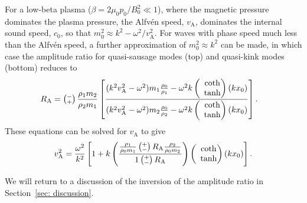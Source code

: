 \documentclass[namedreferences]{solarphysics}
\numberwithin{equation}{section}
\begin{document}
\begin{article}
For a low-beta plasma ($\beta = 2\mu_0p_0/B_0^2 \ll 1$), where the magnetic pressure dominates the plasma pressure, the Alfv\'{e}n speed, $v_\textrm{A}$, dominates the internal sound speed, $c_0$, so that $m_0^2 \approx k^2-\omega^2/v_\textrm{A}^2$. For waves with phase speed much less than the Alfv\'{e}n speed, a further approximation of $m_0^2 \approx k^2$ can be made, in which case the amplitude ratio for quasi-sausage modes (top) and quasi-kink modes (bottom) reduces to
\begin{align}
R_\textrm{A} &= \left(\substack{- \\ +}\right) \frac{\rho_1m_2}{\rho_2m_1} \left[ \frac{(k^2v_\textrm{A}^2-\omega^2)m_1\frac{\rho_0}{\rho_1}-\omega^2k \left(\hspace{-0.07in}\begin{matrix} &\coth \\ &\tanh \end{matrix}\right)(kx_0)}{(k^2v_\textrm{A}^2-\omega^2)m_2\frac{\rho_0}{\rho_2}-\omega^2k \left(\hspace{-0.07in}\begin{matrix} &\coth \\ &\tanh \end{matrix}\right)(kx_0)} \right].
\end{align}
These equations can be solved for $v_\textrm{A}$ to give
\begin{equation}
v_\textrm{A}^2 = \frac{\omega^2}{k^2} \left[1 + k \left( \frac{ \frac{\rho_1}{\rho_0m_1} \left(\substack{+ \\ -}\right) R_\textrm{A}\frac{\rho_2}{\rho_0m_2}}{1 \left(\substack{+ \\ -}\right) R_\textrm{A}} \right) \left(\hspace{-0.07in}\begin{matrix} &\coth \\ &\tanh \end{matrix}\right) (kx_0)\right].
\end{equation}

We will return to a discussion of the inversion of the amplitude ratio in Section~\ref{sec: discussion}.




\end{article}
\end{document}
